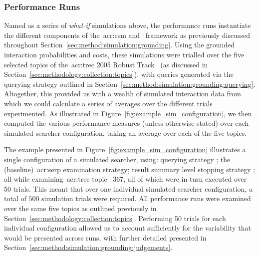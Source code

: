 \subsubsection{Performance Runs}\label{sec:method:simulation:runs:performance}
Named as a series of \emph{what-if} simulations above, the performance runs instantiate the different components of the~\gls{acr:csm} and \simiir~framework as previously discussed throughout Section~\ref{sec:method:simulation:grounding}. Using the grounded interaction probabilities and costs, these simulations were trialled over the five selected topics of the~\gls{acr:trec} 2005 Robust Track~\citep{voorhees2006trec_robust} (as discussed in Section~\ref{sec:methodology:collection:topics}), with queries generated via the querying strategy outlined in Section~\ref{sec:method:simulation:grounding:querying}. Altogether, this provided us with a wealth of simulated interaction data from which we could calculate a series of averages over the different trials experimented. As illustrated in Figure~\ref{fig:example_sim_configuration}, we then computed the various performance measures (unless otherwise stated) over each simulated searcher configuration, taking an average over each of the five topics.

The example presented in Figure~\ref{fig:example_sim_configuration} illustrates a single configuration of a simulated searcher, using: querying strategy ; the  (baseline)~\gls{acr:serp} examination strategy; result summary level stopping strategy ; all while examining~\gls{acr:trec} topic \textnumero~367, all of which were in turn executed over 50 trials. This meant that over one individual simulated searcher configuration, a total of $500$ simulation trials were required. All performance runs were examined over the same five topics as outlined previously in Section~\ref{sec:methodology:collection:topics}. Performing 50 trials for each individual configuration allowed us to account sufficiently for the variability that would be presented across runs, with further detailed presented in Section~\ref{sec:method:simulation:grounding:judgements}.


